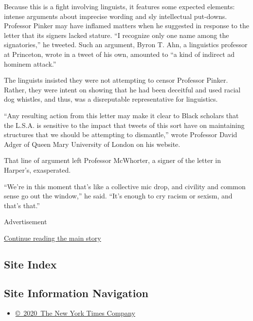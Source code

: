 Because this is a fight involving linguists, it features some expected
elements: intense arguments about imprecise wording and sly intellectual
put-downs. Professor Pinker may have inflamed matters when he suggested
in response to the letter that its signers lacked stature. ``I recognize
only one name among the signatories,'' he tweeted. Such an argument,
Byron T. Ahn, a linguistics professor at Princeton, wrote in a tweet of
his own, amounted to ``a kind of indirect ad hominem attack.''

The linguists insisted they were not attempting to censor Professor
Pinker. Rather, they were intent on showing that he had been deceitful
and used racial dog whistles, and thus, was a disreputable
representative for linguistics.

``Any resulting action from this letter may make it clear to Black
scholars that the L.S.A. is sensitive to the impact that tweets of this
sort have on maintaining structures that we should be attempting to
dismantle,'' wrote Professor David Adger of Queen Mary University of
London on his website.

That line of argument left Professor McWhorter, a signer of the letter
in Harper's, exasperated.

``We're in this moment that's like a collective mic drop, and civility
and common sense go out the window,'' he said. ``It's enough to cry
racism or sexism, and that's that.''

Advertisement

\protect\hyperlink{after-bottom}{Continue reading the main story}

\hypertarget{site-index}{%
\subsection{Site Index}\label{site-index}}

\hypertarget{site-information-navigation}{%
\subsection{Site Information
Navigation}\label{site-information-navigation}}

\begin{itemize}
\tightlist
\item
  \href{https://help.nytimes.com/hc/en-us/articles/115014792127-Copyright-notice}{©~2020~The
  New York Times Company}
\end{itemize}

